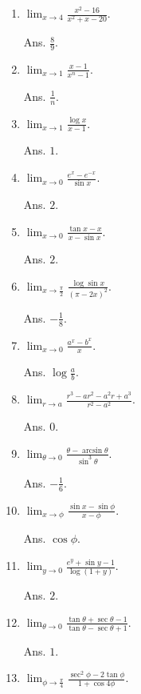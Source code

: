 \begin{enumerate}

\item
$ \lim_{x \to 4} \frac{x^2 - 16}{x^2 + x - 20}$. 

Ans. $\frac{8}{9}$.

\item
$\lim_{x \to 1} \frac{x - 1}{x^n - 1}$. 	  

Ans. $\frac{1}{n}$.

\item
$ \lim_{x \to 1} \frac{\log x}{x - 1}$.

Ans. $1$.

\item
$\lim_{x \to 0} \frac{e^x - e^{-x}}{\sin x}$.

Ans. $2$.

\item
$\lim_{x\to 0} \frac{\tan x - x}{x - \sin x}$. 	 

Ans. $2$.

\item
$\lim_{x \to \frac{\pi}{2}} \frac{\log \sin x}{(\pi - 2x)^2}$.

Ans. $-\frac{1}{8}$.

\item
$\lim_{x \to 0} \frac{a^x - b^x}{x}$.

Ans. $\log \frac{a}{b}$.

\item
$\lim_{r \to a} \frac{r^3 - ar^2 - a^2 r + a^3}{r^2 - a^2}$.

Ans. $0$.

\item
$\lim_{\theta \to 0} \frac{\theta -\arcsin \theta}{\sin^3 \theta}$. 	

Ans. 	$-\frac{1}{6}$.

\item
$\lim_{x \to \phi} \frac{\sin x - \sin \phi}{x - \phi}$.

Ans. $\cos\phi $.

\item
$\lim_{y \to 0} \frac{e^y + \sin y - 1}{\log(1 + y)}$. 	  	

Ans. $2$.

\item
$\lim_{\theta \to 0} \frac{\tan \theta + \sec \theta -1}{\tan \theta -\sec \theta + 1}$. 

Ans. $1$.

\item
$\lim_{\phi \to \frac{\pi}{4}} \frac{\sec^2 \phi - 2 \tan \phi}{1 + \cos 4 \phi}$. 


\end{enumerate}
